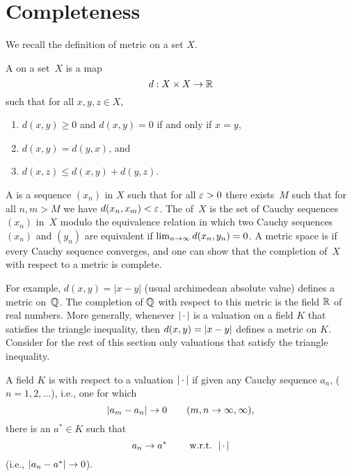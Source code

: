 \section{Completeness}\label{sec:completeness}
We recall the definition of metric on a set $X$.
\begin{definition}[Metric]\label{defn:metric}
A  on a set~$X$ is a map
$$
  d : X \times X \rightarrow \mathbb{R}
$$
such that for all $x,y,z\in X$,
\begin{enumerate}
\item $d(x,y)\geq 0$ and $d(x,y)=0$ if and only if $x=y$,
\item $d(x,y)=d(y,x)$, and
\item $d(x,z)\leq d(x,y)+d(y,z)$.
\end{enumerate}
\end{definition}
A  is a sequence
$(x_n)$ in $X$ such that for all $\varepsilon>0$ there exists~$M$ such that
for all $n,m>M$ we have $d(x_n,x_m)<\varepsilon$.  The 
of~$X$ is the set of Cauchy sequences $(x_n)$ in~$X$ modulo the
equivalence relation in which two Cauchy sequences $(x_n)$ and $(y_n)$
are equivalent if $\lim_{n\rightarrow\infty} d(x_n,y_n)=0$.  A metric space is
 if every Cauchy sequence converges,
and one can show that the completion of~$X$ with respect to a metric
is complete.

For example, $d(x,y)=|x-y|$ (usual archimedean absolute value) defines
a metric on~$\mathbb{Q}$.  The completion of $\mathbb{Q}$ with respect to this metric
is the field $\mathbb{R}$ of real numbers.  More generally, whenever $\left|\,\cdot\,\right|$
is a valuation on a field $K$ that satisfies the triangle inequality,
then $d(x,y)=\left|x-y\right|$ defines a metric on $K$.
Consider for the rest of this section only valuations that
satisfy the triangle inequality. 

\begin{definition}[Complete]
A field $K$ is  with respect to a valuation $\left|\,\cdot\,\right|$
if given any Cauchy sequence $a_n$, ($n=1,2,\ldots$), i.e.,
one for which
$$
\left|a_m - a_n\right| \to 0 \qquad(m,n\to \infty,\infty),
$$
there is an $a^*\in K$ such that
$$
  a_n \to a^* \qquad \text{ w.r.t. }\left|\,\cdot\,\right|
$$
(i.e., $\left|a_n-a^*\right|\to 0$).
\end{definition}

